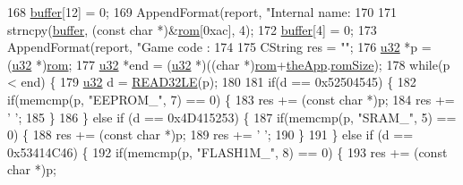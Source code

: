 \begin{DoxyCode}
{{{{168       \mbox{\hyperlink{_g_b_a_8cpp_a28d4d3d8445e73a696b2d6f7eadabd96}{buffer}}[12] = 0;
169       AppendFormat(report, \textcolor{stringliteral}{"Internal name: %
170       
171       strncpy(\mbox{\hyperlink{_g_b_a_8cpp_a28d4d3d8445e73a696b2d6f7eadabd96}{buffer}}, (\textcolor{keyword}{const} \textcolor{keywordtype}{char} *)&\mbox{\hyperlink{_globals_8cpp_adafc6ed627110c42f3893c9783f55320}{rom}}[0xac], 4);
172       \mbox{\hyperlink{_g_b_a_8cpp_a28d4d3d8445e73a696b2d6f7eadabd96}{buffer}}[4] = 0;
173       AppendFormat(report, \textcolor{stringliteral}{"Game code    : %
174 
175       CString res = \textcolor{stringliteral}{""};
176       \mbox{\hyperlink{_system_8h_a10e94b422ef0c20dcdec20d31a1f5049}{u32}} *p = (\mbox{\hyperlink{_system_8h_a10e94b422ef0c20dcdec20d31a1f5049}{u32}} *)\mbox{\hyperlink{_globals_8cpp_adafc6ed627110c42f3893c9783f55320}{rom}};
177       \mbox{\hyperlink{_system_8h_a10e94b422ef0c20dcdec20d31a1f5049}{u32}} *end = (\mbox{\hyperlink{_system_8h_a10e94b422ef0c20dcdec20d31a1f5049}{u32}} *)((\textcolor{keywordtype}{char} *)\mbox{\hyperlink{_globals_8cpp_adafc6ed627110c42f3893c9783f55320}{rom}}+\mbox{\hyperlink{_v_b_a_8cpp_a8095a9d06b37a7efe3723f3218ad8fb3}{theApp}}.\mbox{\hyperlink{class_v_b_a_ab7d47241ad4bc8c0e6717770797e6d57}{romSize}});
178       \textcolor{keywordflow}{while}(p  < end) \{
179         \mbox{\hyperlink{_system_8h_a10e94b422ef0c20dcdec20d31a1f5049}{u32}} d = \mbox{\hyperlink{_port_8h_adc768b10d187a6d70e6b927d589c948d}{READ32LE}}(p);
180     
181         \textcolor{keywordflow}{if}(d == 0x52504545) \{
182           \textcolor{keywordflow}{if}(memcmp(p, \textcolor{stringliteral}{"EEPROM\_"}, 7) == 0) \{
183             res += (\textcolor{keyword}{const} \textcolor{keywordtype}{char} *)p;
184             res += \textcolor{charliteral}{' '};
185           \}
186         \} \textcolor{keywordflow}{else} \textcolor{keywordflow}{if} (d == 0x4D415253) \{
187           \textcolor{keywordflow}{if}(memcmp(p, \textcolor{stringliteral}{"SRAM\_"}, 5) == 0) \{
188             res += (\textcolor{keyword}{const} \textcolor{keywordtype}{char} *)p;
189             res += \textcolor{charliteral}{' '};
190           \}
191         \} \textcolor{keywordflow}{else} \textcolor{keywordflow}{if} (d == 0x53414C46) \{
192           \textcolor{keywordflow}{if}(memcmp(p, \textcolor{stringliteral}{"FLASH1M\_"}, 8) == 0) \{
193             res += (\textcolor{keyword}{const} \textcolor{keywordtype}{char} *)p;
}}}}}}
\end{DoxyCode}
